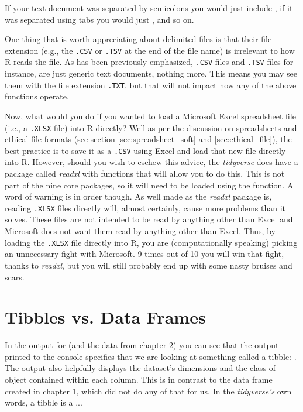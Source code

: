 \vspace{1em}

\noindent
If your text document was separated by semicolons you would just include , if it was separated using tabs you would just , and so on. 

One thing that is worth appreciating about delimited files is that their file extension (e.g., the \texttt{.CSV} or \texttt{.TSV} at the end of the file name) is irrelevant to how R reads the file. As has been previously emphasized, \texttt{.CSV} files and \texttt{.TSV} files for instance, are just generic text documents, nothing more. This means you may see them with the file extension \texttt{.TXT}, but that will not impact how any of the above functions operate.

Now, what would you do if you wanted to load a Microsoft Excel spreadsheet file (i.e., a \texttt{.XLSX} file) into R directly? Well as per the discussion on spreadsheets and ethical file formats (see section \ref{sec:spreadsheet_soft} and \ref{sec:ethical_file}), the best practice is to save it as a \texttt{.CSV} using Excel and load that new file directly into R. However, should you wish to eschew this advice, the \textit{tidyverse} does have a package called \textit{readxl} with functions that will allow you to do this. This is not part of the nine core packages, so it will need to be loaded using the  function. A word of warning is in order though. As well made as the \textit{readxl} package is, reading \texttt{.XLSX} files directly will, almost certainly, cause more problems than it solves. These files are not intended to be read by anything other than Excel and Microsoft does not want them read by anything other than Excel. Thus, by loading the \texttt{.XLSX} file directly into R, you are (computationally speaking) picking an unnecessary fight with Microsoft. 9 times out of 10 you will win that fight, thanks to \textit{readxl}, but you will still probably end up with some nasty bruises and scars.

\section{Tibbles vs. Data Frames}

In the output for  (and the  data from chapter 2) you can see that the output printed to the console specifies that we are looking at something called a \gls{tibble}: . The output also helpfully displays the dataset's dimensions and the class of object contained within each column. This is in contrast to the data frame created in chapter 1, which did not do any of that for us. In the \textit{tidyverse's} own words, a tibble is a ...

